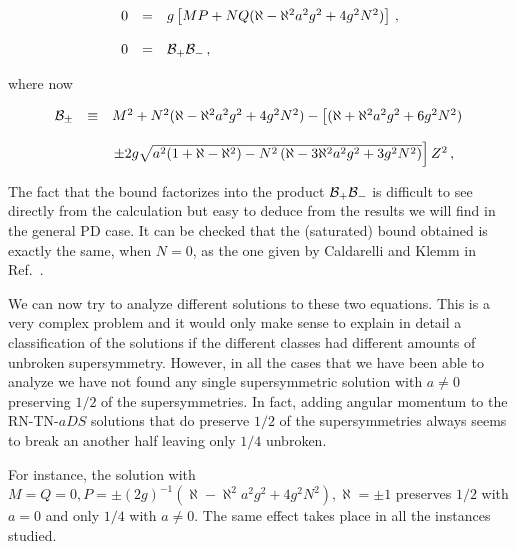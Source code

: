 \documentclass[12pt,a4paper]{article}
\begin{document}
\begin{equation}
\begin{array}{rcl}
0 & = & g\left[ MP+NQ(\aleph -\aleph^{2}a^{2}g^{2}+4g^{2}N^{2}) \right]\, ,\\
& & \\
0 & = & {\cal B}_{+}{\cal B}_{-}\, ,\\
\end{array}
\end{equation}

\noindent where now

\begin{equation}
\begin{array}{rcl}
{\cal B}_{\pm} & \equiv &
M^{2} +N^{2}(\aleph -\aleph^{2}a^{2}g^{2}+4g^{2}N^{2})
-\left[
(\aleph +\aleph^{2}a^{2}g^{2}+6g^{2}N^{2})
\right.
\\
& & \\
& & 
\left.
\pm
2g\sqrt{a^{2}(1+\aleph -\aleph^{2}) 
-N^{2}\left(\aleph -3\aleph^{2}a^{2}g^{2} +3g^{2}N^{2}\right)}
\right]Z^{2}\, ,\\
\end{array}
\end{equation}

The fact that the bound factorizes into the product ${\cal B}_{+}{\cal
  B}_{-}$ is difficult to see directly from the calculation but easy
to deduce from the results we will find in the general PD case.  It
can be checked that the (saturated) bound obtained is exactly the
same, when $N=0$, as the one given by Caldarelli and Klemm in
Ref.~\cite{art:CK}.

We can now try to analyze different solutions to these two equations.
This is a very complex problem and it would only make sense to explain
in detail a classification of the solutions if the different classes
had different amounts of unbroken supersymmetry. However, in all the
cases that we have been able to analyze we have not found any single
supersymmetric solution with $a\neq 0$ preserving $1/2$ of the
supersymmetries. In fact, adding angular momentum to the RN-TN-$aDS$
solutions that do preserve $1/2$ of the supersymmetries always seems
to break an another half leaving only $1/4$ unbroken.

For instance, the solution with $M=Q=0, P=\pm (2g)^{-1}(\aleph
-\aleph^{2}a^{2}g^{2}+4g^{2}N^{2}),\aleph=\pm 1$ preserves $1/2$ with
$a=0$ and only $1/4$ with $a\neq 0$. The same effect takes place
in all the instances studied.

\end{document}
